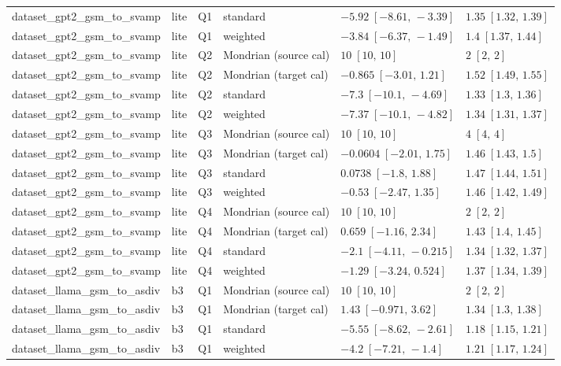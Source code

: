 \begin{longtable}{@{}p{}p{}p{}p{}p{}p{}@{}}
dataset\_gpt2\_gsm\_to\_svamp & lite & Q1 & standard & $-5.92\;[-8.61,\,-3.39]$ & $1.35\;[1.32,\,1.39]$ \\
dataset\_gpt2\_gsm\_to\_svamp & lite & Q1 & weighted & $-3.84\;[-6.37,\,-1.49]$ & $1.4\;[1.37,\,1.44]$ \\
dataset\_gpt2\_gsm\_to\_svamp & lite & Q2 & Mondrian (source cal) & $10\;[10,\,10]$ & $2\;[2,\,2]$ \\
dataset\_gpt2\_gsm\_to\_svamp & lite & Q2 & Mondrian (target cal) & $-0.865\;[-3.01,\,1.21]$ & $1.52\;[1.49,\,1.55]$ \\
dataset\_gpt2\_gsm\_to\_svamp & lite & Q2 & standard & $-7.3\;[-10.1,\,-4.69]$ & $1.33\;[1.3,\,1.36]$ \\
dataset\_gpt2\_gsm\_to\_svamp & lite & Q2 & weighted & $-7.37\;[-10.1,\,-4.82]$ & $1.34\;[1.31,\,1.37]$ \\
dataset\_gpt2\_gsm\_to\_svamp & lite & Q3 & Mondrian (source cal) & $10\;[10,\,10]$ & $4\;[4,\,4]$ \\
dataset\_gpt2\_gsm\_to\_svamp & lite & Q3 & Mondrian (target cal) & $-0.0604\;[-2.01,\,1.75]$ & $1.46\;[1.43,\,1.5]$ \\
dataset\_gpt2\_gsm\_to\_svamp & lite & Q3 & standard & $0.0738\;[-1.8,\,1.88]$ & $1.47\;[1.44,\,1.51]$ \\
dataset\_gpt2\_gsm\_to\_svamp & lite & Q3 & weighted & $-0.53\;[-2.47,\,1.35]$ & $1.46\;[1.42,\,1.49]$ \\
dataset\_gpt2\_gsm\_to\_svamp & lite & Q4 & Mondrian (source cal) & $10\;[10,\,10]$ & $2\;[2,\,2]$ \\
dataset\_gpt2\_gsm\_to\_svamp & lite & Q4 & Mondrian (target cal) & $0.659\;[-1.16,\,2.34]$ & $1.43\;[1.4,\,1.45]$ \\
dataset\_gpt2\_gsm\_to\_svamp & lite & Q4 & standard & $-2.1\;[-4.11,\,-0.215]$ & $1.34\;[1.32,\,1.37]$ \\
dataset\_gpt2\_gsm\_to\_svamp & lite & Q4 & weighted & $-1.29\;[-3.24,\,0.524]$ & $1.37\;[1.34,\,1.39]$ \\
dataset\_llama\_gsm\_to\_asdiv & b3 & Q1 & Mondrian (source cal) & $10\;[10,\,10]$ & $2\;[2,\,2]$ \\
dataset\_llama\_gsm\_to\_asdiv & b3 & Q1 & Mondrian (target cal) & $1.43\;[-0.971,\,3.62]$ & $1.34\;[1.3,\,1.38]$ \\
dataset\_llama\_gsm\_to\_asdiv & b3 & Q1 & standard & $-5.55\;[-8.62,\,-2.61]$ & $1.18\;[1.15,\,1.21]$ \\
dataset\_llama\_gsm\_to\_asdiv & b3 & Q1 & weighted & $-4.2\;[-7.21,\,-1.4]$ & $1.21\;[1.17,\,1.24]$ \\

\end{longtable}

